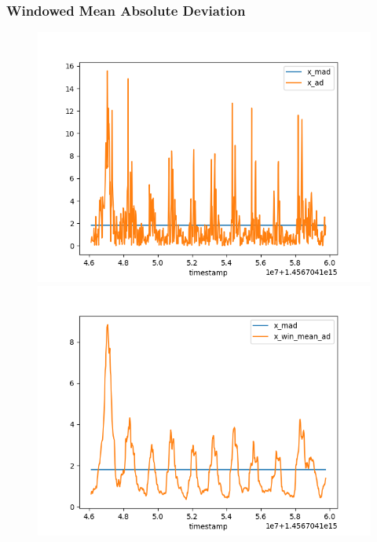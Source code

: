 \documentclass{beamer}
\begin{document}
\begin{frame}
\frametitle{Windowed Mean Absolute Deviation}
\begin{figure}
	\includegraphics[scale=.35]{mad_ad}
	\includegraphics[scale=.35]{mad_win_ad}
\end{figure}

\end{frame}
\end{document}
